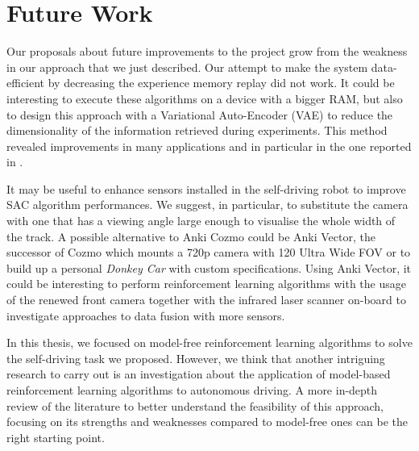 \section{Future Work}

Our proposals about future improvements to the project grow from the weakness in our approach that we just described.
Our attempt to make the system data-efficient by decreasing the experience memory replay did not work.
It could be interesting to execute these algorithms on a device with a bigger RAM, but also to design this approach with a Variational Auto-Encoder (VAE) \cite{kingma2013auto} to reduce the dimensionality of the information retrieved during experiments.
This method revealed improvements in many applications and in particular in the one reported in \cite{kendall2018learning,kendall2019learning}.

It may be useful to enhance sensors installed in the self-driving robot to improve SAC algorithm performances.
We suggest, in particular, to substitute the camera with one that has a viewing angle large enough to visualise the whole width of the track.
A possible alternative to Anki Cozmo could be Anki Vector, the successor of Cozmo which mounts a 720p camera with 120 Ultra Wide FOV or to build up a personal \textit{Donkey Car} with custom specifications.
Using Anki Vector, it could be interesting to perform reinforcement learning algorithms with the usage of the renewed front camera together with the infrared laser scanner on-board to investigate approaches to data fusion with more sensors.

In this thesis, we focused on model-free reinforcement learning algorithms to solve the self-driving task we proposed.
However, we think that another intriguing research to carry out is an investigation about the application of model-based reinforcement learning algorithms to autonomous driving.
A more in-depth review of the literature to better understand the feasibility of this approach, focusing on its strengths and weaknesses compared to model-free ones can be the right starting point.